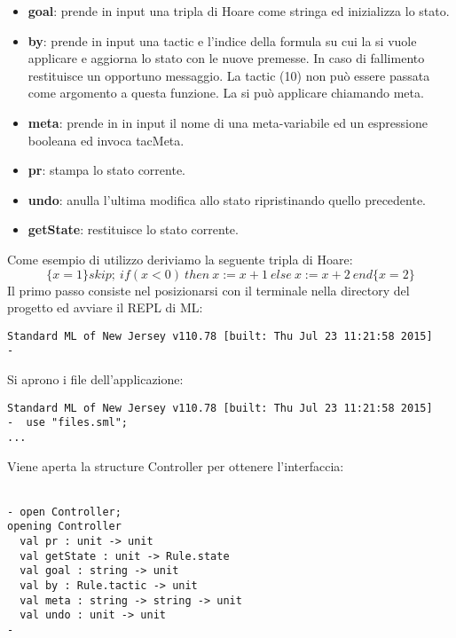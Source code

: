 \documentclass[]{article}
\begin{document}
\begin{itemize}
	\item \textbf{goal}: prende in input una tripla di Hoare come stringa ed inizializza lo stato.
	\item \textbf{by}: prende in input una tactic e l'indice della formula su cui la si vuole applicare e aggiorna lo stato con le nuove premesse. In caso di fallimento restituisce un opportuno messaggio. La tactic (10) non pu\`o essere passata come argomento a questa funzione. La si pu\`o applicare chiamando meta.
	\item \textbf{meta}: prende in in input il nome di una meta-variabile ed un espressione booleana ed invoca tacMeta.
	\item \textbf{pr}: stampa lo stato corrente.
    \item \textbf{undo}: anulla l'ultima modifica allo stato ripristinando quello precedente.
    \item \textbf{getState}: restituisce lo stato corrente.
\end{itemize}
Come esempio di utilizzo deriviamo la seguente tripla di Hoare:
\begin{equation*}
	\{x=1\} skip; \ if(x < 0) \ then\  x:=x+1 \ else \ x:=x+2 \ end \{x = 2\}
\end{equation*}
Il primo passo consiste nel posizionarsi con il terminale nella directory del progetto ed avviare il REPL di ML:
\begin{center}
\begin{BVerbatim}
Standard ML of New Jersey v110.78 [built: Thu Jul 23 11:21:58 2015]
-
\end{BVerbatim}
\end{center}
Si aprono i file dell'applicazione:
\begin{center}
\begin{BVerbatim}
Standard ML of New Jersey v110.78 [built: Thu Jul 23 11:21:58 2015]
-  use "files.sml";
...
\end{BVerbatim}
\end{center}
\pagebreak
Viene aperta la structure Controller per ottenere l'interfaccia:
\\
\\
\begin{BVerbatim}
- open Controller;
opening Controller
  val pr : unit -> unit
  val getState : unit -> Rule.state
  val goal : string -> unit
  val by : Rule.tactic -> unit
  val meta : string -> string -> unit
  val undo : unit -> unit
-
\end{BVerbatim}
\\
\end{document}
